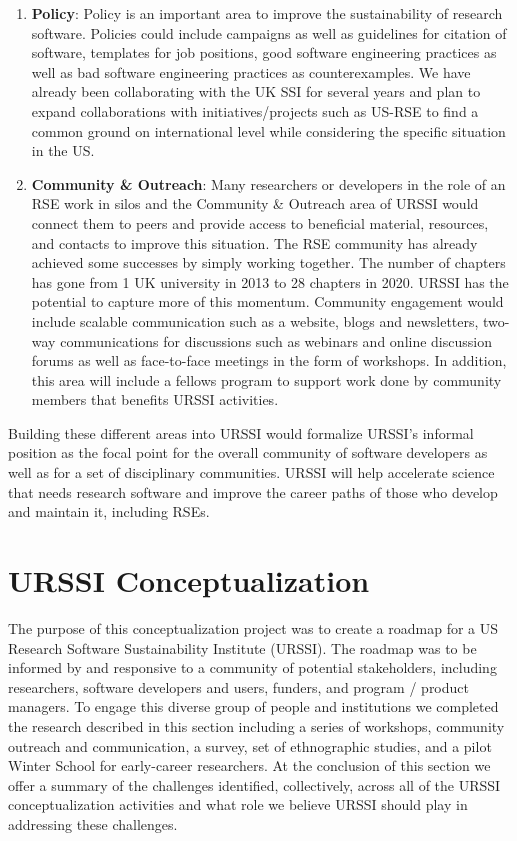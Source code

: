 \documentclass[
]{book}
\begin{document}
\begin{enumerate}
\item
  \textbf{Policy}: Policy is an important area to improve the sustainability of research software. Policies could include campaigns as well as guidelines for citation of software, templates for job positions, good software engineering practices as well as bad software engineering practices as counterexamples. We have already been collaborating with the UK SSI for several years and plan to expand collaborations with initiatives/projects such as US-RSE to find a common ground on international level while considering the specific situation in the US.
\item
  \textbf{Community \& Outreach}: Many researchers or developers in the role of an RSE work in silos and the Community \& Outreach area of URSSI would connect them to peers and provide access to beneficial material, resources, and contacts to improve this situation. The RSE community has already achieved some successes by simply working together. The number of chapters has gone from 1 UK university in 2013 to 28 chapters in 2020. URSSI has the potential to capture more of this momentum. Community engagement would include scalable communication such as a website, blogs and newsletters, two-way communications for discussions such as webinars and online discussion forums as well as face-to-face meetings in the form of workshops. In addition, this area will include a fellows program to support work done by community members that benefits URSSI activities.
\end{enumerate}

Building these different areas into URSSI would formalize URSSI's informal position as the focal point for the overall community of software developers as well as for a set of disciplinary communities. URSSI will help accelerate science that needs research software and improve the career paths of those who develop and maintain it, including RSEs.

\hypertarget{chapter2}{%
\chapter{URSSI Conceptualization}\label{chapter2}}

The purpose of this conceptualization project was to create a roadmap for a US
Research Software Sustainability Institute (URSSI). The roadmap was to be
informed by and responsive to a community of potential stakeholders, including
researchers, software developers and users, funders, and program / product managers.
To engage this diverse group of people and institutions we completed the
research described in this section including a series of workshops, community outreach and
communication, a survey, set of ethnographic studies, and a pilot Winter School
for early-career researchers. At the conclusion of this section we offer a
summary of the challenges identified, collectively, across all of the URSSI
conceptualization activities and what role we believe URSSI should play in
addressing these challenges.
\end{document}
